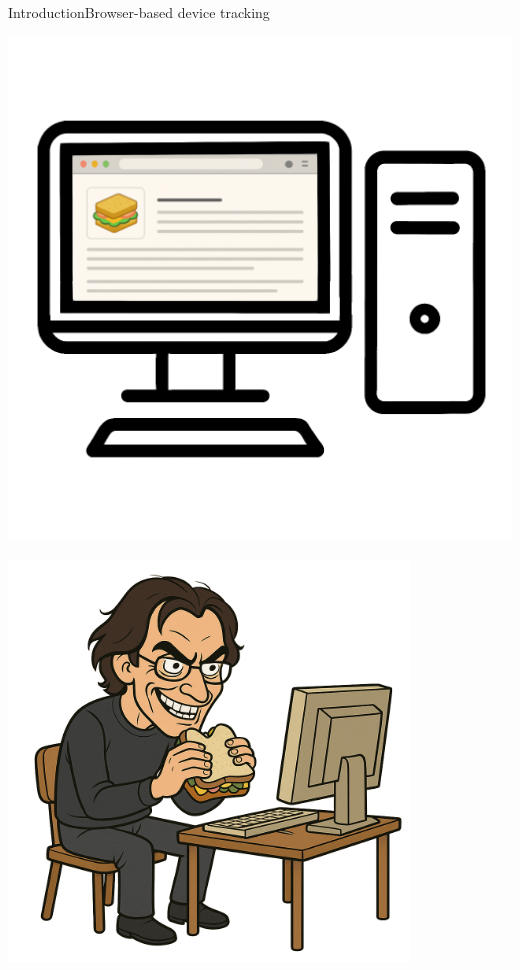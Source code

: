\documentclass[aspectratio=169, hyperref={colorlinks=true, allcolors=SecondaryColor}, c]{beamer}
\begin{document}
\begin{frame}[fragile]{Introduction}{Browser-based device tracking}
	\begin{transformation}
		\begin{adjustbox}{scale=1}
			\begin{minipage}{1\textwidth}
				\includegraphics[width=1\textwidth]{./figures/computer_alpha_screen_2_website.png}
			\end{minipage}
		\end{adjustbox}
		\begin{adjustbox}{scale=1}
			\begin{minipage}{1\textwidth}
				\includegraphics[width=0.8\textwidth]{./figures/evil_computer_scientist_alpha.png}

\end{minipage}
\end{adjustbox}
\end{transformation}
\end{frame}
\end{document}
